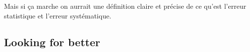 Mais si ça marche on aurrait une définition claire et précise de ce qu'est l'erreur statistique et l'erreur systématique.


\subsection{Looking for better} %
\label{sub:looking_for_better}




